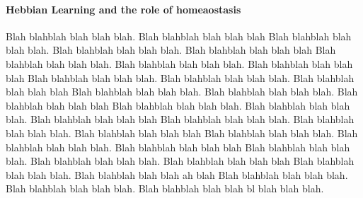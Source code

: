 \documentclass[12pt]{article}
\begin{document}
\paragraph*{Hebbian Learning and the role of homeaostasis}
Blah blahblah blah blah blah. Blah blahblah blah blah blah Blah blahblah blah blah blah.
Blah blahblah blah blah blah. Blah blahblah blah blah blah Blah blahblah blah blah blah.
Blah blahblah blah blah blah. Blah blahblah blah blah blah Blah blahblah blah blah blah.
Blah blahblah blah blah blah. Blah blahblah blah blah blah Blah blahblah blah blah blah.
Blah blahblah blah blah blah. Blah blahblah blah blah blah Blah blahblah blah blah blah.
Blah blahblah blah blah blah. Blah blahblah blah blah blah Blah blahblah blah blah blah.
Blah blahblah blah blah blah. Blah blahblah blah blah blah Blah blahblah blah blah blah.
Blah blahblah blah blah blah. Blah blahblah blah blah blah Blah blahblah blah blah blah.
Blah blahblah blah blah blah. Blah blahblah blah blah blah Blah blahblah blah blah blah.
Blah blahblah blah blah ah blah Blah blahblah blah blah blah.
Blah blahblah blah blah blah. Blah blahblah blah blah bl blah blah blah.
%
\end{document}
